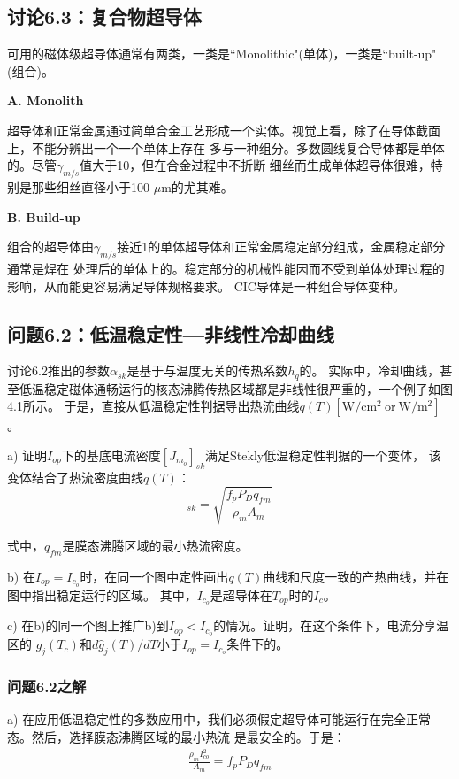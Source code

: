 \subsection{讨论6.3：复合物超导体}
可用的磁体级超导体通常有两类，一类是``Monolithic"(单体)，一类是``built-up"(组合)。

\textbf{A. Monolith}

超导体和正常金属通过简单合金工艺形成一个实体。视觉上看，除了在导体截面上，不能分辨出一个一个单体上存在
多与一种组分。多数圆线复合导体都是单体的。尽管$\gamma_{m/s}$值大于10，但在合金过程中不折断
细丝而生成单体超导体很难，特别是那些细丝直径小于100 $\mu$m的尤其难。

\textbf{B. Build-up}

组合的超导体由$\gamma_{m/s}$接近1的单体超导体和正常金属稳定部分组成，金属稳定部分通常是焊在
处理后的单体上的。稳定部分的机械性能因而不受到单体处理过程的影响，从而能更容易满足导体规格要求。
CIC导体是一种组合导体变种。

\subsection{问题6.2：低温稳定性---非线性冷却曲线}
讨论6.2推出的参数$\alpha_{sk}$是基于与温度无关的传热系数$h_q$的。
实际中，冷却曲线，甚至低温稳定磁体通畅运行的核态沸腾传热区域都是非线性很严重的，一个例子如图4.1所示。
于是，直接从低温稳定性判据导出热流曲线$q(T)[\mathrm{W/cm^2\ or\ W/m^2}] $。

a) 证明$I_{op}$下的基底电流密度$[J_{m_o}]_{sk}$满足Stekly低温稳定性判据的一个变体，
该变体结合了热流密度曲线$q(T)$：
\begin{equation}%
[J_{m_o}]_{sk}=\sqrt{\frac{f_pP_Dq_{fm}}{\rho_mA_m}}
\end{equation}

式中，$q_{fm}$是膜态沸腾区域的最小热流密度。

b) 在$I_{op}=I_{c_o}$时，在同一个图中定性画出$q(T)$曲线和尺度一致的产热曲线，并在图中指出稳定运行的区域。
其中，$I_{c_o}$是超导体在$T_{op}$时的$I_c$。

c) 在b)的同一个图上推广b)到$I_{op}<I_{c_o}$的情况。证明，在这个条件下，电流分享温区的
$g_j(T_c)$和$d\hat{g}_j(T)/dT$小于$I_{op}=I_{c_o}$条件下的。

\subsubsection{问题6.2之解}
a) 在应用低温稳定性的多数应用中，我们必须假定超导体可能运行在完全正常态。然后，选择膜态沸腾区域的最小热流
是最安全的。于是：
\begin{align*}%
\frac {\rho_mI_{co}^2}{A_m}=f_pP_Dq_{fm} \tag{S2.1}
\end{align*}

